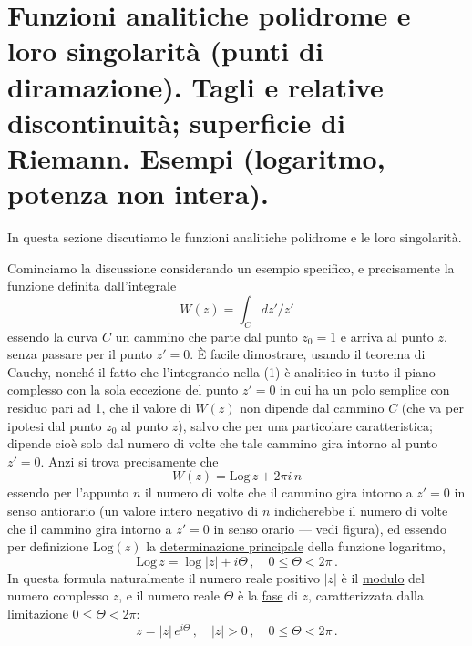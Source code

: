 \documentclass[11pt, a4paper]{book}
\numberwithin{equation}{section}
\begin{document}
\section[Funzioni analitiche polidrome e loro singolarità. Tagli e relative discontinuità; superficie di Riemann. Esempi]{Funzioni analitiche polidrome e loro singolarità (punti di diramazione). Tagli e relative discontinuità; superficie di Riemann. Esempi (logaritmo, potenza non intera).}

In questa sezione discutiamo le funzioni analitiche polidrome e le loro singolarità.

Cominciamo la discussione considerando un esempio specifico, e precisamente la funzione definita dall'integrale
\begin{equation}
W(z) = \int_C dz' \big/ z' \tag{1}
\end{equation}
essendo la curva $C$ un cammino che parte dal punto $z_0 = 1$ e arriva al punto $z$, senza passare per il punto $z' = 0$. È facile dimostrare, usando il teorema di Cauchy, nonché il fatto che l'integrando nella (1) è analitico in tutto il piano complesso con la sola eccezione del punto $z'=0$ in cui ha un polo semplice con residuo pari ad 1, che il valore di $W(z)$ non dipende dal cammino $C$ (che va per ipotesi dal punto $z_0$ al punto $z$), salvo che per una particolare caratteristica; dipende cioè solo dal numero di volte che tale cammino gira intorno al punto $z'=0$. Anzi si trova precisamente che
\begin{equation}
W(z) = \mathrm{Log}\,z + 2\pi i\,n \tag{2}
\end{equation}
essendo per l'appunto $n$ il numero di volte che il cammino gira intorno a $z'=0$ in senso antiorario (un valore intero negativo di $n$ indicherebbe il numero di volte che il cammino gira intorno a $z'=0$ in senso orario — vedi figura), ed essendo per definizione $\mathrm{Log}(z)$ la \underline{determinazione principale} della funzione logaritmo,
\begin{equation}
\mathrm{Log}\,z = \log|z| + i\Theta\,, \quad 0 \leq \Theta < 2\pi\,. \tag{3}
\end{equation}
In questa formula naturalmente il numero reale positivo $|z|$ è il \underline{modulo} del numero complesso $z$, e il numero reale $\Theta$ è la \underline{fase} di $z$, caratterizzata dalla limitazione $0 \leq \Theta < 2\pi$:
\begin{equation}
z = |z|\,e^{i\Theta}\,, \quad |z|>0\,, \quad 0 \leq \Theta < 2\pi\,. \tag{4}
\end{equation}
\end{document}
